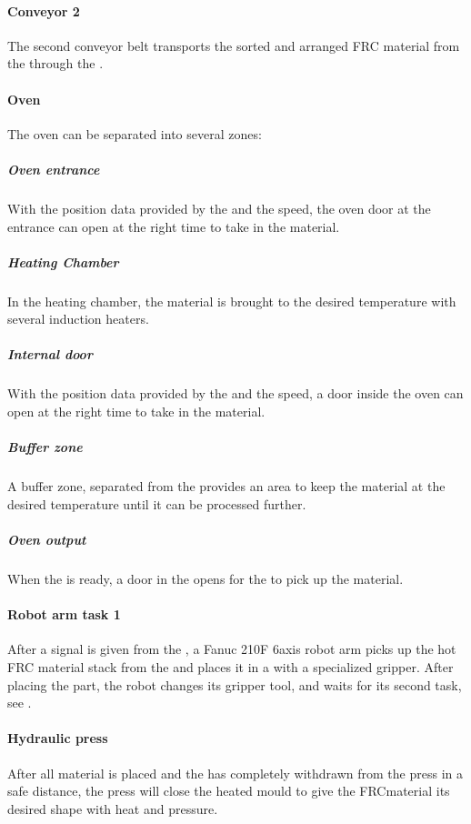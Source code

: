 \paragraph{Conveyor 2} \label{sec:conveyor2}
The second conveyor belt transports the sorted and arranged \ac{FRC} material from the  through the . 

\paragraph{Oven}\label{sec:oven}
The oven can be separated into several zones:
\subparagraph{Oven entrance}
With the position data provided by the  and the  speed, the oven door at the entrance can open at the right time to take in the material.
\subparagraph{Heating Chamber} \label{sec:HeatingChamber}
In the heating chamber, the material is brought to the desired temperature with several induction heaters.
\subparagraph{Internal door}
With the position data provided by the  and the  speed, a door inside the oven can open at the right time to take in the material.
\subparagraph{Buffer zone} \label{sec:BufferZone}
A buffer zone, separated from the  provides an area to keep the material at the desired temperature until it can be processed further.
\subparagraph{Oven output}
When the  is ready, a door in the  opens for the  to pick up the material.

\paragraph{Robot arm task 1} \label{sec:RobotArm1}
After a signal is given from the , a Fanuc 210F 6axis robot arm picks up the hot \ac{FRC} material stack from the  and places it in a  with a specialized gripper.
After placing the part, the robot changes its gripper tool, and waits for its second task, see .

\paragraph{Hydraulic press} \label{sec:HydraulicPress}
After all material is placed and the  has completely withdrawn from the press in a safe distance, the press will close the heated mould to give the \ac{FRC}material its desired shape with heat and pressure.

